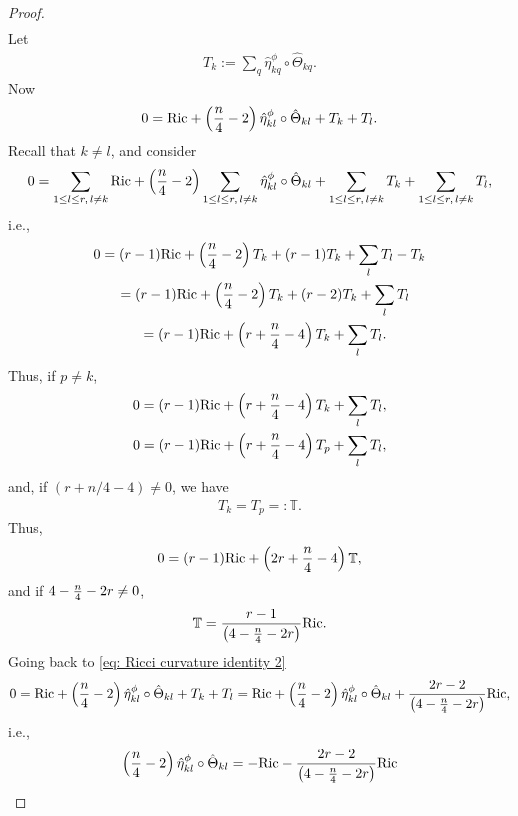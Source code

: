 \documentclass[10pt,a4paper]{amsart}
\numberwithin{equation}{section}
\begin{document}
\begin{proof}
\begin{gather*}
\end{gather*}
Let
\begin{gather*}T_k:=\sum_q \hat{\eta}^\phi_{kq}\circ\hat\Theta_{kq}.\end{gather*}
Now
\begin{gather}
0={\rm Ric} + \left({n\over 4}-2\right)\hat\eta_{kl}^\phi\circ\hat\Theta_{kl} + T_k + T_l . \label{eq: Ricci curvature identity 2}
\end{gather}
Recall that $k\not = l$, and consider
\begin{gather*}
0=\sum_{1\leq l\leq r,\,l\not= k} {\rm Ric} +\left({n\over 4}-2\right)\sum_{1\leq l\leq r,\,l\not= k}\hat\eta_{kl}^\phi\circ\hat\Theta_{kl}
 +\sum_{1\leq l\leq r,\,l\not= k} T_k + \sum_{1\leq l\leq r,\,l\not= k} T_l,
\end{gather*}
i.e.,
\begin{gather*}
0 = (r-1) {\rm Ric}+ \left({n\over 4}-2\right)T_k +(r-1) T_k + \sum_{l} T_l - T_k\\
\hphantom{0}{} = (r-1) {\rm Ric}+ \left({n\over 4}-2\right)T_k +(r-2) T_k + \sum_l T_l\\
\hphantom{0}{} = (r-1) {\rm Ric}+ \left(r+{n\over 4}-4\right)T_k + \sum_l T_l.
\end{gather*}
Thus, if $p\not =k$,
\begin{gather*}
0 =(r-1) {\rm Ric}+ \left(r+{n\over 4}-4\right)T_k + \sum_l T_l,\\
0 =(r-1) {\rm Ric}+ \left(r+{n\over 4}-4\right)T_p + \sum_l T_l,
\end{gather*}
and, if $(r+n/4-4)\not =0$, we have
\begin{gather*}T_k=T_p=:\mathbb{T}.\end{gather*}
Thus,
\begin{gather*}
0=(r-1) {\rm Ric}+\left(2r+{n\over 4}-4\right)\mathbb{T} ,
\end{gather*}
and if $4-{n\over 4}-2r\not=0$,
\begin{gather*}
 \mathbb{T}= {r-1\over \left(4-{n\over 4}-2r\right)} {\rm Ric} .
\end{gather*}
Going back to \eqref{eq: Ricci curvature identity 2}
\begin{gather*}
0 ={\rm Ric}+ \left({n\over 4}-2\right)\hat\eta_{kl}^\phi\circ\hat\Theta_{kl} +T_k + T_l =
{\rm Ric}+ \left({n\over 4}-2\right)\hat\eta_{kl}^\phi\circ\hat\Theta_{kl} +{2r-2\over \left(4-{n\over 4}-2r\right)} {\rm Ric} ,
\end{gather*}
i.e.,
\begin{gather*}
\left({n\over 4}-2\right)\hat\eta_{kl}^\phi\circ\hat\Theta_{kl} =-{\rm Ric} -{2r-2\over \left(4-{n\over 4}-2r\right)} {\rm Ric}

\end{gather*}
\end{proof}
\end{document}
